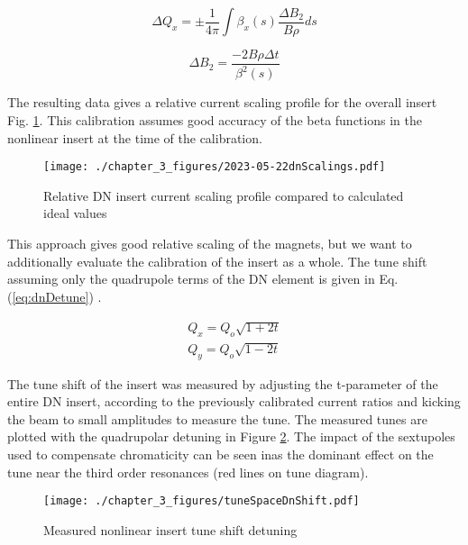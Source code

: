 \begin{equation}
    	\Delta Q_{x} = \pm \frac{1}{4\pi}\int{\beta_x(s) \frac{\Delta B_2}{B\rho} ds}
    	\label{eq:quadErrShift}
\end{equation}

\begin{equation}
	\Delta B_2 = \frac{-2B\rho \Delta t}{\beta^2(s)}
	\label{eq:dnQuadTerm}
\end{equation}

The resulting data gives a relative current scaling profile for the overall insert Fig. \ref{fig:dnIscaling}. This calibration assumes good accuracy of the beta functions in the nonlinear insert at the time of the calibration.

\begin{figure}
    \centering
    \texttt{[image: ./chapter\_3\_figures/2023-05-22dnScalings.pdf]}
    \caption{Relative DN insert current scaling profile compared to calculated ideal values}
    \label{fig:dnIscaling}
\end{figure}

This approach gives good relative scaling of the magnets, but we want to additionally evaluate the calibration of the insert as a whole. The tune shift assuming only the quadrupole terms of the DN element is given in Eq. (\ref{eq:dnDetune}) \cite{nagaitsevNonlinearOptics}.

\begin{equation}
	\begin{split}
	Q_{x} = Q_{o}\sqrt{1+2t} \\
        Q_{y} = Q_{o}\sqrt{1-2t}
	\end{split}
	\label{eq:dnDetune}
\end{equation}

The tune shift of the insert was measured by adjusting the t-parameter of the entire DN insert, according to the previously calibrated current ratios and kicking the beam to small amplitudes to measure the tune. The measured tunes are plotted with the quadrupolar detuning in Figure \ref{fig:dnDetuning}. The impact of the sextupoles used to compensate chromaticity can be seen inas the dominant effect on the tune near the third order resonances (red lines on tune diagram).

\begin{figure}
    \centering
    \texttt{[image: ./chapter\_3\_figures/tuneSpaceDnShift.pdf]}
    \caption{Measured nonlinear insert tune shift detuning}
    \label{fig:dnDetuning}
\end{figure}

